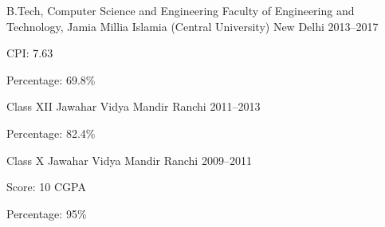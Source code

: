
\begin{cventries}

\cventry%
  {B.Tech, Computer Science and Engineering} %
  {Faculty of Engineering and Technology, Jamia Millia Islamia (Central
   University)} %
  {New Delhi} %
  {2013--2017} %
  {%
    \begin{cvitems}%
      \item{CPI: 7.63}
      \item{Percentage: 69.8\%}
    \end{cvitems}
  }

\cventry%
  {Class XII} %
  {Jawahar Vidya Mandir} %
  {Ranchi} %
  {2011--2013} %
  {%
    \begin{cvitems} %
      \item{Percentage: 82.4\%}
    \end{cvitems}
  }

\cventry%
  {Class X} %
  {Jawahar Vidya Mandir} %
  {Ranchi} %
  {2009--2011} %
  {%
    \begin{cvitems} %
      \item{Score: 10 CGPA}
      \item{Percentage: 95\%}
    \end{cvitems}
  }

\end{cventries}
